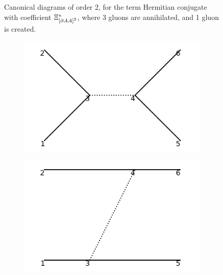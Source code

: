 \documentclass[11pt,a4paper,twoside,pdf]{article}
\numberwithin{equation}{section}
\begin{document}
\begin{figure}[h!]
\begin{subfigure}[t]{0.33\textwidth}
        \caption{ }
    \end{subfigure}
    \caption{Canonical diagrams of order 2, for the term Hermitian conjugate with 
    coefficient 
    $\Xi_{\left[ \partial AA \right]^2}^*$, where 3 gluons are annihilated, and
    1 gluon is created.}
    \label{fig:cannonical2_3to1}
\end{figure}

\begin{figure}[h!]
    \centering
    \begin{subfigure}[t]{0.24\textwidth}
        \centering
        \includegraphics[width=\textwidth]{plots/canonical/order2/4.png}
        \caption{ }
    \end{subfigure}%
    \begin{subfigure}[t]{0.24\textwidth}
        \centering
        \includegraphics[width=\textwidth]{plots/canonical/order2/5.png}
        \caption{ }
    \end{subfigure}
    \begin{subfigure}[t]{0.24\textwidth}

\end{subfigure}
\end{figure}
\end{document}
